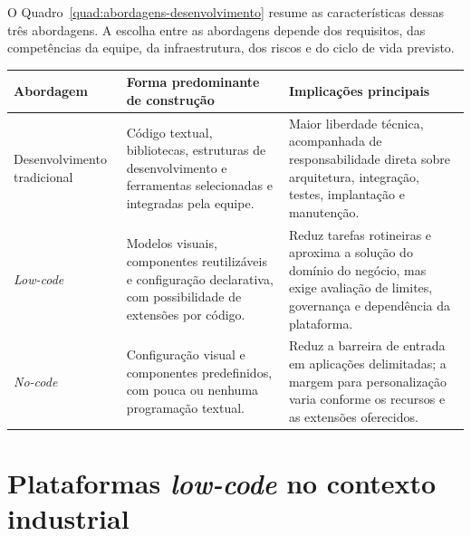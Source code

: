 O Quadro~\ref{quad:abordagens-desenvolvimento} resume as características dessas três abordagens. A escolha entre as abordagens depende dos requisitos, das competências da equipe, da infraestrutura, dos riscos e do ciclo de vida previsto.

\begin{quadro}[htb]
    \centering
    \caption{Síntese das abordagens de desenvolvimento de aplicações}
    \label{quad:abordagens-desenvolvimento}
    \footnotesize
    \begin{tabularx}{\textwidth}{|>{\raggedright\arraybackslash}p{2.6cm}
                                    |>{\raggedright\arraybackslash}X
                                    |>{\raggedright\arraybackslash}X|}
        \hline
        \textbf{Abordagem} & \textbf{Forma predominante de construção} & \textbf{Implicações principais} \\
        \hline
        Desenvolvimento tradicional & Código textual, bibliotecas, estruturas de desenvolvimento e ferramentas selecionadas e integradas pela equipe. & Maior liberdade técnica, acompanhada de responsabilidade direta sobre arquitetura, integração, testes, implantação e manutenção. \\
        \hline
        \textit{Low-code} & Modelos visuais, componentes reutilizáveis e configuração declarativa, com possibilidade de extensões por código. & Reduz tarefas rotineiras e aproxima a solução do domínio do negócio, mas exige avaliação de limites, governança e dependência da plataforma. \\
        \hline
        \textit{No-code} & Configuração visual e componentes predefinidos, com pouca ou nenhuma programação textual. & Reduz a barreira de entrada em aplicações delimitadas; a margem para personalização varia conforme os recursos e as extensões oferecidos. \\
        \hline
    \end{tabularx}
\end{quadro}

\section{Plataformas \textit{low-code} no contexto industrial}
\label{sec:lowcode-industria}

